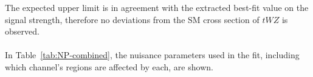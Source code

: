 The expected upper limit is in agreement with the extracted best-fit value on the signal strength, therefore no deviations from the SM cross section of $tWZ$ is observed.\\\\

In Table~\ref{tab:NP-combined}, the nuisance parameters used in the fit, including which channel's regions are affected by each, are shown.
\begin{table}[]
\footnotesize
{}
\end{table}
